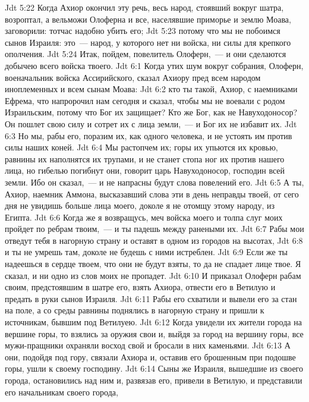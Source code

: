 \rsbpar\vs Jdt 5:22 Когда Ахиор окончил эту речь, весь народ, стоявший вокруг шатра, возроптал, а вельможи Олоферна и все, населявшие приморье и землю Моава, заговорили: тотчас надобно убить его;
\vs Jdt 5:23 потому что мы не побоимся сынов Израиля: это~--- народ, у которого нет ни войска, ни силы для крепкого ополчения.
\vs Jdt 5:24 Итак, пойдем, повелитель Олоферн,~--- и они сделаются добычею всего войска твоего.
\vs Jdt 6:1 Когда утих шум вокруг собрания, Олоферн, военачальник войска Ассирийского, сказал Ахиору пред всем народом иноплеменных и всем сынам Моава:
\vs Jdt 6:2 кто ты такой, Ахиор, с наемниками Ефрема, что напророчил нам сегодня и сказал, чтобы мы не воевали с родом Израильским, потому что Бог их защищает? Кто же Бог, как не Навуходоносор? Он пошлет свою силу и сотрет их с лица земли,~--- и Бог их не избавит их.
\vs Jdt 6:3 Но мы, рабы его, поразим их, как одного человека, и не устоять им против силы наших коней.
\vs Jdt 6:4 Мы растопчем их; горы их упьются их кровью, равнины их наполнятся их трупами, и не станет стопа ног их против нашего лица, но гибелью погибнут они, говорит царь Навуходоносор, господин всей земли. Ибо он сказал,~--- и не напрасны будут слова повелений его.
\vs Jdt 6:5 А ты, Ахиор, наемник Аммона, высказавший слова эти в день неправды твоей, от сего дня не увидишь больше лица моего, доколе я не отомщу этому народу,  из Египта.
\vs Jdt 6:6 Когда же я возвращусь, меч войска моего и толпа слуг моих пройдет по ребрам твоим,~--- и ты падешь между ранеными их.
\vs Jdt 6:7 Рабы мои отведут тебя в нагорную страну и оставят в одном из городов на высотах,
\vs Jdt 6:8 и ты не умрешь там, доколе не будешь с ними истреблен.
\vs Jdt 6:9 Если же ты надеешься в сердце твоем, что они не будут взяты, то да не спадает лице твое. Я сказал, и ни одно из слов моих не пропадет.
\vs Jdt 6:10 И приказал Олоферн рабам своим, предстоявшим в шатре его, взять Ахиора, отвести его в Ветилую и предать в руки сынов Израиля.
\vs Jdt 6:11 Рабы его схватили и вывели его за стан на поле, а со среды равнины поднялись в нагорную страну и пришли к источникам, бывшим под Ветилуею.
\vs Jdt 6:12 Когда увидели их жители города на вершине горы, то взялись за оружия свои и, выйдя за город на вершину горы, все мужи-пращники охраняли восход свой и бросали в них каменьями.
\vs Jdt 6:13 А они, подойдя под гору, связали Ахиора и, оставив его брошенным при подошве горы, ушли к своему господину.
\vs Jdt 6:14 Сыны же Израиля, вышедшие из своего города, остановились над ним и, развязав его, привели в Ветилую, и представили его начальникам своего города,
